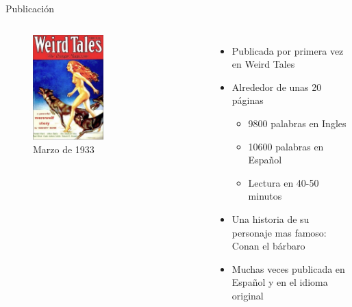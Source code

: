 \begin{frame}{Publicación}
\begin{columns}
    \begin{figure}[htb]
    \centering
        \includegraphics[width=0.5\textwidth]{img/WeirdTales-1933-03}
        \caption{Marzo de 1933}
    \end{figure}
    \begin{itemize}
         \item Publicada por primera vez en Weird Tales
         \item Alrededor de unas 20 páginas
         \begin{itemize}
            \item 9800 palabras en Ingles
            \item 10600 palabras en Español
            \item Lectura en 40-50 minutos
         \end{itemize}
         \item Una historia de su personaje mas famoso: Conan el bárbaro
         \item Muchas veces publicada en Español y en el idioma original
    \end{itemize}
\end{columns}
\end{frame}
\note{

}

